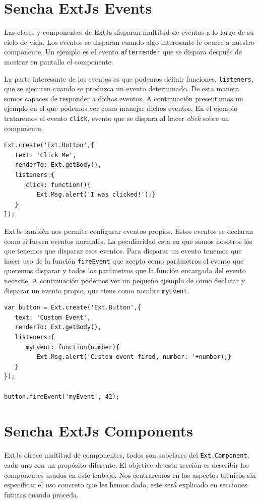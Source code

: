 \section{Sencha ExtJs Events}
	Las clases y componentes de ExtJs disparan multitud de eventos a lo largo de su ciclo de vida. Los eventos se disparan cuando algo interesante
	le ocurre a nuestro componente. Un ejemplo es el evento \texttt{afterrender} que se dispara después de mostrar en pantalla el componente.
	\par
	La parte interesante de los eventos es que podemos definir funciones, \texttt{listeners}, que se ejecuten cuando se produzca un evento
	determinado. De esta manera somos capaces de responder a dichos eventos. A continuación presentamos un ejemplo en el que podemos ver como
	manejar dichos eventos. En el ejemplo trataremos el evento \texttt{click}, evento que se dispara al hacer \emph{click} sobre un componente. 
	\begin{lstlisting}
Ext.create('Ext.Button',{
   text: 'Click Me',
   renderTo: Ext.getBody(),
   listeners:{
      click: function(){
         Ext.Msg.alert('I was clicked!');}
   }
});
	\end{lstlisting}
	\par
	ExtJs también nos permite configurar eventos propios. Estos eventos se declaran como si fuesen eventos normales. La peculiaridad esta en que
	somos nosotros los que tenemos que disparar esos eventos. Para disparar un evento tenemos que hacer uso de la función \texttt{fireEvent} que
	acepta como parámetros el evento que queremos disparar y todos los parámetros que la función encargada del evento necesite. A continuación
	podemos ver un pequeño ejemplo de como declarar y disparar un evento propio, que tiene como nombre \texttt{myEvent}.
	\begin{lstlisting}
var button = Ext.create('Ext.Button',{
   text: 'Custom Event',
   renderTo: Ext.getBody(),
   listeners:{
      myEvent: function(number){
         Ext.Msg.alert('Custom event fired, number: '+number);}
   }
});

button.fireEvent('myEvent', 42);
	\end{lstlisting}

\section{Sencha ExtJs Components}
	ExtJs ofrece multitud de componentes, todos son subclases del \texttt{Ext.Component}, cada uno con un propósito diferente. El objetivo de esta
	sección es describir los componentes usados en este trabajo. Nos centraremos en los aspectos técnicos sin especificar el uso concreto que les
	hemos dado, este será explicado en secciones futuras cuando proceda. 
